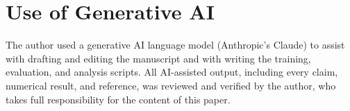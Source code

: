\documentclass[11pt]{article}
\begin{document}
\section*{Use of Generative AI}

The author used a generative AI language model (Anthropic's Claude) to assist
with drafting and editing the manuscript and with writing the training,
evaluation, and analysis scripts. All AI-assisted output, including every claim,
numerical result, and reference, was reviewed and verified by the author, who
takes full responsibility for the content of this paper.



\end{document}
